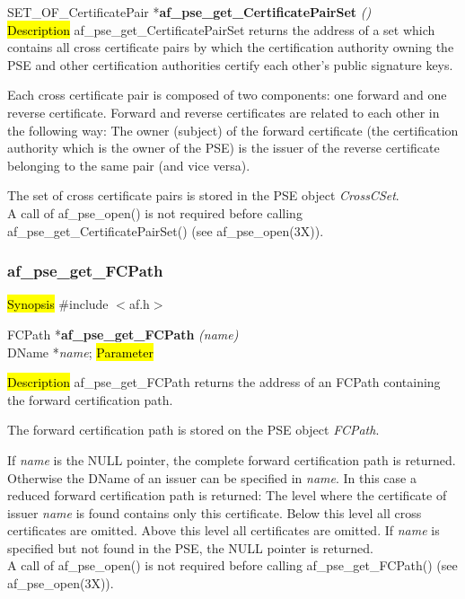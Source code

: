 SET\_OF\_CertificatePair *{\bf af\_pse\_get\_CertificatePairSet} {\em ()} \\
\hl{Description}
af\_pse\_get\_CertificatePairSet returns the address of a set which contains all 
cross certificate pairs by which the certification authority owning the PSE and other
certification authorities certify each other's public signature keys.

Each cross certificate pair is composed of two components: one forward and one
reverse certificate. Forward and reverse certificates are related to each other in the 
following way: The owner (subject) of the forward certificate (the certification authority
which is the owner of the PSE) is the issuer of the reverse certificate belonging to the same
pair (and vice versa).

The set of cross certificate pairs is stored in the PSE object {\em CrossCSet}.
\\ [1em]
A call of af\_pse\_open() is not required before calling af\_pse\_get\_CertificatePairSet()
(see af\_pse\_open(3X)).

\subsubsection{af\_pse\_get\_FCPath}
\label{af_get_FCPath}
\hl{Synopsis}
\#include $<$af.h$>$ 

FCPath *{\bf af\_pse\_get\_FCPath} {\em (name)} \\
DName *{\em name};
\hl{Parameter}

\hl{Description}
af\_pse\_get\_FCPath returns the address of an FCPath containing the forward certification path.

The forward certification path is stored on the PSE object
{\em FCPath}.

If {\em name} is the NULL pointer, the complete forward certification path is returned. Otherwise
the DName of an issuer can be specified in {\em name}. In this case a reduced forward 
certification path is returned:
\be
\m The level where the certificate of issuer {\em name} is found contains only this certificate.
\m Below this level all cross certificates are omitted.
\m Above this level all certificates are omitted.
\ee
If {\em name} is specified but not found in the PSE, the NULL pointer is returned.
\\ [1em]
A call of af\_pse\_open() is not required before calling af\_pse\_get\_FCPath()
(see af\_pse\_open(3X)).

